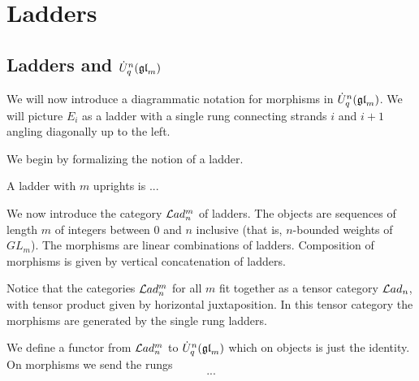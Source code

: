 \documentclass[10pt,leqno]{article}
\begin{document}
\section{Ladders}
\label{sec:ladders}

\subsection{Ladders and $\dot{{{U}}}_q^n({\mathfrak{gl}}_m)$ }
We will now introduce a diagrammatic notation for morphisms in $ \dot{{{U}}}_q^n({\mathfrak{gl}}_m)$.  We will picture $E_i $ as a ladder with a single rung connecting strands $ i $ and $ i+1 $ angling  diagonally up to the left.

We begin by formalizing the notion of a ladder.
\begin{defn}
A ladder with $ m $ uprights is ...
\end{defn}

We now introduce the category  $ \mathcal{L}ad_n^m $ of ladders. The objects are sequences of length $m$ of integers between $0$ and $n$ inclusive (that is, $n$-bounded weights of $GL_m$). The morphisms are linear combinations of ladders.  Composition of morphisms is given by vertical concatenation of ladders.

\begin{rem}
Notice that the categories $\mathcal{L}ad_n^m$ for all $m$ fit together as a tensor category $\mathcal{L}ad_n$, with tensor product given by horizontal juxtaposition.  In this tensor category the morphisms are generated by the single rung ladders.
\end{rem}

We define a functor from $\mathcal{L}ad_n^m$ to $\dot{{{U}}}_q^n({\mathfrak{gl}}_m)$ which on objects is just the identity.  On morphisms we send the rungs
$$...$$
\end{document}
